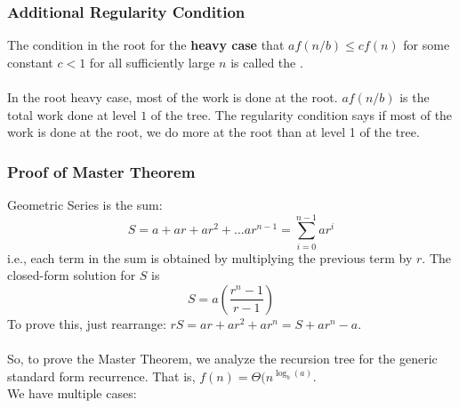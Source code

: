 \documentclass{article}
\begin{document}
\subsubsection{Additional Regularity Condition}
The condition in the root for the \textbf{heavy case} that $af(n/b) \leq cf(n)$ for some constant $c < 1$ for all sufficiently large $n$ is called the .\\
\\
In the root heavy case, most of the work is done at the root. $af(n/b)$ is the total work done at level $1$ of the tree. The regularity condition says if most of the work is done at the root, we do more at the root than at level 1 of the tree.

\subsubsection{Proof of Master Theorem}
Geometric Series is the sum:
$$S = a + ar + ar^2 + ... ar^{n-1} = \sum_{i=0}^{n-1}ar^i$$
i.e., each term in the sum is obtained by multiplying the previous term by $r$. The closed-form solution for $S$ is
$$S = a\left( \frac{r^n - 1}{r-1}\right)$$
To prove this, just rearrange: $rS = ar + ar^2 + ar^n = S + ar^n - a$.\\
\\
So, to prove the Master Theorem, we analyze the recursion tree for the generic standard form recurrence. That is, $f(n) = \Theta(n^{\log_b(a)}$.\\
We have multiple cases:
\end{document}
